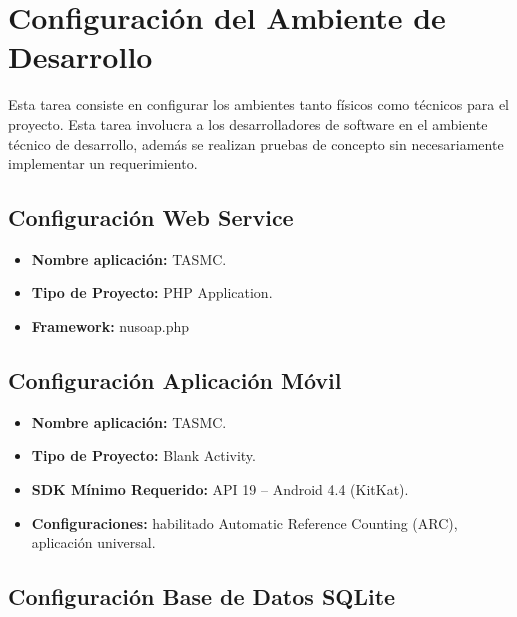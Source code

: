 
\chapter{Configuración del Ambiente de Desarrollo} %

\label{ConfiguracionAmbienteDesarrollo} %


Esta tarea consiste en configurar los ambientes tanto físicos como técnicos para el proyecto. Esta tarea involucra a los desarrolladores de software en el ambiente técnico de desarrollo, además se realizan pruebas de concepto sin necesariamente implementar un requerimiento.

\section{Configuración Web Service}

\begin{itemize}
	\item \textbf{Nombre aplicación: } TASMC.
	\item \textbf{Tipo de Proyecto: } PHP Application.
	\item \textbf{Framework: } nusoap.php
\end{itemize}

\section{Configuración Aplicación Móvil }

\begin{itemize}
	\item \textbf{Nombre aplicación: } TASMC.
	\item \textbf{Tipo de Proyecto: } Blank Activity.
	\item \textbf{SDK Mínimo Requerido: } API 19 – Android 4.4 (KitKat).
	\item \textbf{Configuraciones: } habilitado Automatic Reference Counting (ARC), aplicación universal.
\end{itemize}

\section{Configuración Base de Datos SQLite}

